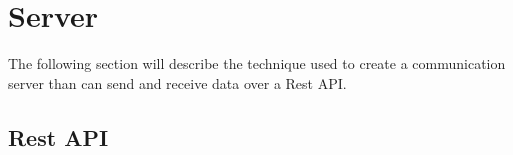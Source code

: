 \section{Server}\label{sec:theoryServer}
The following section will describe the technique used to create a communication
server than can send and receive data over a Rest API.

\subsection{Rest API}\label{sec:theoryServerRest}

